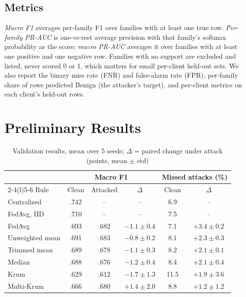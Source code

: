 \documentclass[journal]{IEEEtran}
\begin{document}
\subsection{Metrics}\label{sec:metrics}
\emph{Macro F1} averages per-family F1 over families with at least one true row. \emph{Per-family PR-AUC} is one-vs-rest average precision with that family's softmax probability as the score; \emph{macro PR-AUC} averages it over families with at least one positive and one negative row. Families with no support are excluded and listed, never scored 0 or 1, which matters for small per-client held-out sets. We also report the binary miss rate (FNR) and false-alarm rate (FPR), per-family share of rows predicted Benign (the attacker's target), and per-client metrics on each client's held-out rows.

\section{Preliminary Results}

\begin{table}[t]
\caption{Validation results, mean over 5 seeds; $\Delta$ = paired change under attack (points, mean $\pm$ std)}
\label{tab:results}
\centering\footnotesize
\setlength{\tabcolsep}{2.6pt}
\begin{tabular}{@{}lccccc@{}}
\toprule
& \multicolumn{3}{c}{Macro F1} & \multicolumn{2}{c}{Missed attacks (\%)} \\
\cmidrule(lr){2-4}\cmidrule(l){5-6}
Rule & Clean & Attacked & $\Delta$ & Clean & $\Delta$ \\
\midrule
Centralized & .742 & -- & -- & 6.9 & -- \\
FedAvg, IID & .710 & -- & -- & 7.5 & -- \\
\midrule
FedAvg & .693 & .682 & $-1.1\pm0.4$ & 7.1 & $+3.4\pm0.2$ \\
Unweighted mean & .691 & .683 & $-0.8\pm0.2$ & 8.1 & $+2.3\pm0.3$ \\
Trimmed mean & .689 & .678 & $-1.1\pm0.3$ & 8.2 & $+2.1\pm0.1$ \\
Median & .688 & .676 & $-1.2\pm0.4$ & 8.4 & $+2.1\pm0.4$ \\
Krum & .629 & .612 & $-1.7\pm1.3$ & 11.5 & $+1.9\pm3.6$ \\
Multi-Krum & .666 & .680 & $+1.4\pm2.0$ & 8.8 & $+1.2\pm1.2$ \\
\bottomrule
\end{tabular}
\end{table}
\end{document}
